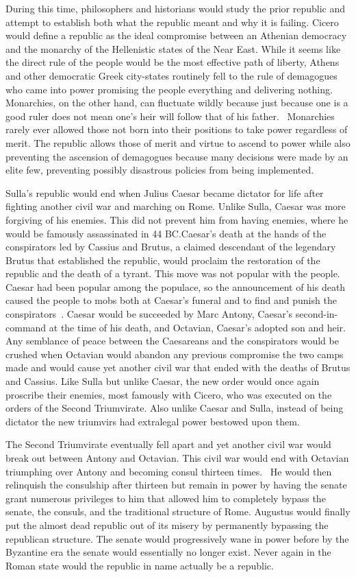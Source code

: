 \documentclass[12pt]{article}
\begin{document}
    During this time, philosophers and historians would study the prior republic and attempt to establish both what the republic meant and why it is failing. Cicero would define a republic as the ideal compromise between an Athenian democracy and the monarchy of the Hellenistic states of the Near East. While it seems like the direct rule of the people would be the most effective path of liberty, Athens and other democratic Greek city-states routinely fell to the rule of demagogues who came into power promising the people everything and delivering nothing. Monarchies, on the other hand, can fluctuate wildly because just because one is a good ruler does not mean one's heir will follow that of his father.~\autocite{Cicero-DeRePublica}  Monarchies rarely ever allowed those not born into their positions to take power regardless of merit. The republic allows those of merit and virtue to ascend to power while also preventing the ascension of demagogues because many decisions were made by an elite few, preventing possibly disastrous policies from being implemented.

    Sulla's republic would end when Julius Caesar became dictator for life after fighting another civil war and marching on Rome. Unlike Sulla, Caesar was more forgiving of his enemies. This did not prevent him from having enemies, where he would be famously assassinated in 44 BC.\@ Caesar's death at the hands of the conspirators led by Cassius and Brutus, a claimed descendant of the legendary Brutus that established the republic, would proclaim the restoration of the republic and the death of a tyrant. This move was not popular with the people. Caesar had been popular among the populace, so the announcement of his death caused the people to mobs both at Caesar's funeral and to find and punish the conspirators~\autocite{RomanRevolution}. Caesar would be succeeded by Marc Antony, Caesar's second-in-command at the time of his death, and Octavian, Caesar's adopted son and heir. Any semblance of peace between the Caesareans and the conspirators would be crushed when Octavian would abandon any previous compromise the two camps made and would cause yet another civil war that ended with the deaths of Brutus and Cassius. Like Sulla but unlike Caesar, the new order would once again proscribe their enemies, most famously with Cicero, who was executed on the orders of the Second Triumvirate. Also unlike Caesar and Sulla, instead of being dictator the new triumvirs had extralegal power bestowed upon them.

    The Second Triumvirate eventually fell apart and yet another civil war would break out between Antony and Octavian. This civil war would end with Octavian triumphing over Antony and becoming consul thirteen times.~\autocite{Dio} He would then relinquish the consulship after thirteen but remain in power by having the senate grant numerous privileges to him that allowed him to completely bypass the senate, the consuls, and the traditional structure of Rome. Augustus would finally put the almost dead republic out of its misery by permanently bypassing the republican structure. The senate would progressively wane in power before by the Byzantine era the senate would essentially no longer exist. Never again in the Roman state would the republic in name actually be a republic.

\printbibliography
\end{document}
